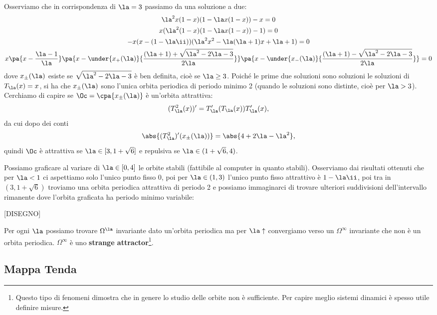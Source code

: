 Osserviamo che in corrispondenza di $\la=3$ passiamo da una soluzione a due:
\begin{gather*}
\la^2 x(1-x)(1-\la x(1-x))-x=0\\
x(\la^2(1-x)(1-\la x(1-x))-1)=0\\
-x(x-(1-\la\ii))(\la^2x^2-\la(\la+1)x+\la+1)=0\\
x\pa{x-\frac{\la-1}\la}\pa{x-\under{x_+(\la)}{\frac{(\la+1)+\sqrt{\la^2-2\la-3}}{2\la}}}\pa{x-\under{x_-(\la)}{\frac{(\la+1)-\sqrt{\la^2-2\la-3}}{2\la}}}=0
\end{gather*}
dove $x_{\pm}(\la)$ esiste se $\sqrt{\la^2-2\la-3}$ \`e ben definita, cio\`e se $\la\geq 3$. Poich\'e le prime due soluzioni sono soluzioni le soluzioni di $T_\la(x)=x$, si ha che $x_{\pm}(\la)$ sono l'unica orbita periodica di periodo minimo 2 (quando le soluzioni sono distinte, cio\`e per $\la>3$).\\
Cerchiamo di capire se $\Oc=\cpa{x_{\pm}(\la)}$ \`e un'orbita attrattiva:
\[(T_\la^2(x))'=T_\la'(T_\la(x))T'_\la(x),\]
da cui dopo dei conti
\[\abs{(T^2_\la)'(x_{\pm}(\la))}=\abs{4+2\la-\la^2},\]
quindi $\Oc$ \`e attrattiva se $\la\in [3,1+\sqrt 6]$ e repulsiva se $\la\in (1+\sqrt 6,4)$.
\vspace{0.25cm}

\noindent Possiamo graficare al variare di $\la\in [0,4]$ le orbite stabili (fattibile al computer in quanto stabili). Osserviamo dai risultati ottenuti che per $\la<1$ ci aspettiamo solo l'unico punto fisso $0$, poi per $\la\in(1,3)$ l'unico punto fisso attrattivo \`e $1-\la\ii$, poi tra in $(3,1+\sqrt 6)$ troviamo una orbita periodica attrattiva di periodo 2 e possiamo immaginarci di trovare ulteriori suddivisioni dell'intervallo rimanente dove l'orbita graficata ha periodo minimo variabile:

[DISEGNO]

Per ogni $\la$ possiamo trovare $\Omega^\la$ invariante dato un'orbita periodica ma per $\la\uparrow$ convergiamo verso un $\Omega^\infty$ invariante che non \`e un orbita periodica. $\Omega^\infty$ \`e uno \textbf{strange attractor}\footnote{Questo tipo di fenomeni dimostra che in genere lo studio delle orbite non \`e sufficiente. Per capire meglio sistemi dinamici \`e spesso utile definire misure.}.



\subsection{Mappa Tenda}

